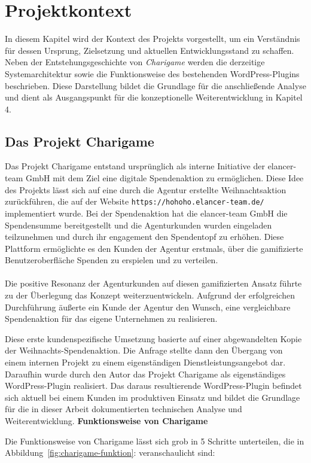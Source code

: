 \chapter{Projektkontext}
In diesem Kapitel wird der Kontext des Projekts vorgestellt, um ein Verständnis für dessen Ursprung, Zielsetzung und aktuellen Entwicklungsstand zu schaffen.
Neben der Entstehungsgeschichte von \textit{Charigame} werden die derzeitige Systemarchitektur sowie die Funktionsweise des bestehenden WordPress-Plugins beschrieben.
Diese Darstellung bildet die Grundlage für die anschließende Analyse und dient als Ausgangspunkt für die konzeptionelle Weiterentwicklung in Kapitel 4.
\section{Das Projekt Charigame}

Das Projekt Charigame entstand ursprünglich als interne Initiative der elancer-team GmbH mit dem Ziel eine digitale Spendenaktion zu ermöglichen.
Diese Idee des Projekts lässt sich auf eine durch die Agentur erstellte Weihnachtsaktion zurückführen, die auf der Website \texttt{https://hohoho.elancer-team.de/} implementiert wurde.
Bei der Spendenaktion hat die elancer-team GmbH die Spendensumme bereitgestellt und die Agenturkunden wurden eingeladen teilzunehmen und durch ihr engagement den Spendentopf zu erhöhen.
Diese Plattform ermöglichte es den Kunden der Agentur erstmals, über die gamifizierte Benutzeroberfläche Spenden zu erspielen und zu verteilen.
\\\\
Die positive Resonanz der Agenturkunden auf diesen gamifizierten Ansatz führte zu der Überlegung das Konzept weiterzuentwickeln.
Aufgrund der erfolgreichen Durchführung äußerte ein Kunde der Agentur den Wunsch, eine vergleichbare Spendenaktion für das eigene Unternehmen zu realisieren.

Diese erste kundenspezifische Umsetzung basierte auf einer abgewandelten Kopie der Weihnachts-Spendenaktion.
Die Anfrage stellte dann den Übergang von einem internen Projekt zu einem eigenständigen Dienstleistungsangebot dar.
Daraufhin wurde durch den Autor das Projekt Charigame als eigenständiges WordPress-Plugin realisiert.
Das daraus resultierende WordPress-Plugin befindet sich aktuell bei einem Kunden im produktiven Einsatz und bildet die Grundlage für die in dieser Arbeit dokumentierten technischen Analyse und Weiterentwicklung.
\newpage
\textbf{Funktionsweise von Charigame}

Die Funktionsweise von Charigame lässt sich grob in 5 Schritte unterteilen, die in Abbildung~\ref{fig:charigame-funktion}: veranschaulicht sind:

